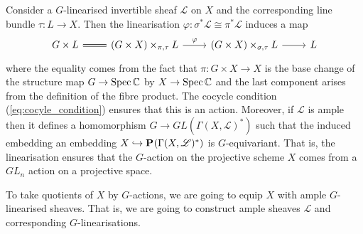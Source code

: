 \documentclass[12pt]{ociamthesis}  %
\begin{document}
\begin{example}\label{ex:linearised_action_on_bundle}
  Consider a $G$-linearised invertible sheaf $\mathscr L$ on $X$
  and the corresponding line bundle $\tau : L\to X$. Then the linearisation
  $\varphi : \sigma^*\mathscr L \cong \pi^*\mathscr L$ induces
  a map
  \begin{equation*}
    \begin{tikzcd}
      {G\times L} & {(G\times X)\times_{\pi,\tau} L} & {(G\times X)\times_{\sigma,\tau} L} & L
      \arrow[Rightarrow, no head, from=1-1, to=1-2]
      \arrow["\varphi", from=1-2, to=1-3]
      \arrow[from=1-3, to=1-4]
    \end{tikzcd}
  \end{equation*}
  where the equality comes from the fact that $\pi : G\times X \to X$
  is the base change of the structure map $G\to\operatorname{Spec}\mathbb C$
  by $X\to\operatorname{Spec}\mathbb C$ and the last component arises from the
  definition of the fibre product. The cocycle condition
  (\ref{eq:cocyle_condition}) ensures that this is an action. \cite[84]{huybrechts2010}
  Moreover, if $\mathscr L$ is ample then it defines a homomorphism
  $G\to GL(\Gamma(X,\mathscr L)^*)$ such that the induced embedding
  an embedding $X\hookrightarrow\mathbf{P}^{}_{}(\Gamma(X,\mathscr L)^*)$ is
  $G$-equivariant. \cite[Remark 5.20]{hoskins2016} That is, the
  linearisation ensures that the $G$-action on the projective
  scheme $X$ comes from a $GL_n$ action on a projective space.
\end{example}

To take quotients of $X$ by $G$-actions, we are going to equip
$X$ with ample $G$-linearised sheaves. That is, we are
going to construct ample sheaves $\mathscr L$ and corresponding
$G$-linearisations.
\end{document}
